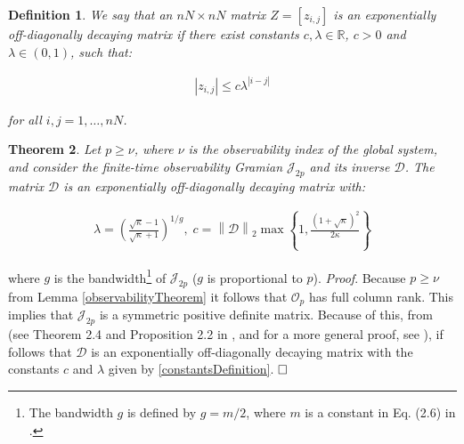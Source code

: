 \documentclass[journal,10pt]{IEEEtran}
\newtheorem{thm}{Theorem}[section]
\newtheorem{definition}[thm]{Definition}
\begin{document}
\begin{definition} \cite{benzi2007} We say that an $nN \times nN$ matrix $Z=[z_{i,j}]$ is an exponentially off-diagonally decaying matrix if there exist constants $c,\lambda\in\mathbb{R}$, $c>0$ and $\lambda\in(0,1)$, such that:
\begin{small}
\begin{align}
|z_{i,j}|\le c \lambda^{|i-j|}
\label{spatialDecayDefinition}
\end{align}
\end{small}
for all $i,j=1,\ldots,nN$. \\ \end{definition} 
\begin{thm} Let $p \ge \nu$, where $\nu$ is the observability index of the global system, and consider the finite-time observability Gramian $\mathcal{J}_{2p}$ and its inverse $\mathcal{D}$. The matrix $\mathcal{D}$ is an exponentially off-diagonally decaying matrix with:
\begin{small}
\begin{align}
 \lambda=\left(\frac{\sqrt{\kappa}-1}{\sqrt{\kappa}+1}\right)^{1/g} , \; c=\left\|\mathcal{D}\right\|_{2}\max \left\lbrace 1,\frac{(1+\sqrt{\kappa})^{2}}{2\kappa} \right\rbrace 
\label{constantsDefinition}
\end{align}
\end{small}
\label{mainTheoremSpatialDecay}
\end{thm}
where $g$ is the bandwidth\footnote{The bandwidth $g$ is defined by $g=m/2$, where $m$ is a constant in Eq. (2.6) in \cite{demko1984}.} of $\mathcal{J}_{2p}$ ($g$ is proportional to $p$).
\textit{Proof}. Because $p\ge \nu$ from Lemma \ref{observabilityTheorem} it follows that $\mathcal{O}_{p}$ has full column rank. This implies that $\mathcal{J}_{2p}$ is a symmetric positive definite matrix. Because of this, from \cite{demko1984} (see Theorem 2.4 and Proposition 2.2 in \cite{demko1984}, and for a more general proof, see \cite{benzi2007}), if follows that $\mathcal{D}$ is an exponentially off-diagonally decaying matrix with the
constants $c$ and $\lambda$ given by \eqref{constantsDefinition}. $\hfill \square$ \\
\end{document}

